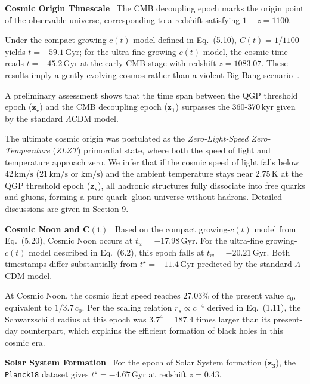 \documentclass[12pt,leqno]{article}
\begin{document}
	\bigskip
	{\bf Cosmic Origin Timescale}\,\,\,
	The CMB decoupling epoch marks the origin point of the observable universe, corresponding to a redshift satisfying $1+z=1100$. 
	
	\medskip
	Under the compact growing-$c(t)$ model defined in Eq.~(5.10), $C(t)=1/1100$ yields $t=-59.1\,\mathrm{Gyr}$; for the ultra-fine growing-$c(t)$ model, the cosmic time reads $t=-45.2\,\mathrm{Gyr}$ at the early CMB stage with redshift $z=1083.07$. These results imply a gently evolving cosmos rather than a violent Big Bang scenario~\cite{Weinberg:2008}. 
	
	\medskip
	A preliminary assessment shows that the time span between the QGP threshold epoch ($\boldsymbol{z_{\star}}$) and the CMB decoupling epoch ($\boldsymbol{z_{1}}$) surpasses the 360-370\,$\mathrm{kyr}$ given by the standard $\Lambda$CDM model.
	
	\medskip
	The ultimate cosmic origin was postulated as the \textit{Zero-Light-Speed Zero-Temperature} (\textit{ZLZT}) primordial state, where both the speed of light and temperature approach zero. We infer that if the cosmic speed of light falls below  42\,$\mathrm{km/s}$ (21$\,\mathrm{km/s}$ or  $\mathrm{km/s}$) and the ambient temperature stays near 2.75$\,\mathrm{K}$ at the QGP threshold epoch ($\boldsymbol{z_{\star}}$), all hadronic structures fully dissociate into free quarks and gluons, forming a pure quark–gluon universe without hadrons. Detailed discussions are given in Section 9.
	
	
	\bigskip
	{\bf Cosmic Noon and  $\boldsymbol{C(t)}$}\,\,\,
	Based on the compact growing-$c(t)$ model from Eq.~(5.20), Cosmic Noon occurs at $t_w = -17.98\,\mathrm{Gyr}$. For the ultra-fine growing-$c(t)$ model described in Eq.~(6.2), this epoch falls at $t_w = -20.21\,\mathrm{Gyr}$. Both timestamps differ substantially from $t^\star = -11.4\,\mathrm{Gyr}$ predicted by the standard $\Lambda$CDM model. 
		
	\medskip
	At Cosmic Noon, the cosmic light speed reaches $27.03\%$ of the present value $c_0$, equivalent to $1/3.7\,c_0$. Per the scaling relation $r_s \propto c^{-4}$ derived in Eq.~(1.11), the Schwarzschild radius at this epoch was $3.7^4 = 187.4$ times larger than its present-day counterpart, which explains the efficient formation of black holes in this cosmic era.

		
	\bigskip
	{\bf Solar System Formation}\,\,\,
	For the epoch of Solar System formation ($\boldsymbol{z_3}$), the \texttt{Planck18} dataset gives $t^\star = -4.67\,\mathrm{Gyr}$ at redshift $z=0.43$. 
	
\end{document}
